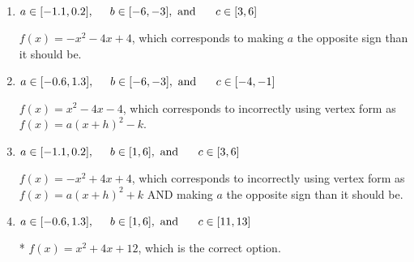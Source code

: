 \documentclass{extbook}[14pt]
\begin{document}
\begin{enumerate}
{\begin{enumerate}[label=\Alph*.]
$f(x)=x^{2} -4 x + 12$, which corresponds to incorrectly using vertex form as $f(x) = a(x+h)^2+k$.
\item \( a \in [-1.1, 0.2], \hspace*{5mm} b \in [-6, -3], \text{ and } \hspace*{5mm} c \in [3, 6] \)

$f(x)=-x^{2} -4 x + 4$, which corresponds to making $a$ the opposite sign than it should be.
\item \( a \in [-0.6, 1.3], \hspace*{5mm} b \in [-6, -3], \text{ and } \hspace*{5mm} c \in [-4, -1] \)

$f(x)=x^{2} -4 x -4$, which corresponds to incorrectly using vertex form as $f(x) = a(x+h)^2 - k$.
\item \( a \in [-1.1, 0.2], \hspace*{5mm} b \in [1, 6], \text{ and } \hspace*{5mm} c \in [3, 6] \)

$f(x)=-x^{2} +4 x + 4$, which corresponds to incorrectly using vertex form as $f(x) = a(x+h)^2+k$ AND making $a$ the opposite sign than it should be.
\item \( a \in [-0.6, 1.3], \hspace*{5mm} b \in [1, 6], \text{ and } \hspace*{5mm} c \in [11, 13] \)

* $f(x)=x^{2} +4 x + 12$, which is the correct option.
\end{enumerate}

}
\end{enumerate}
\end{document}
